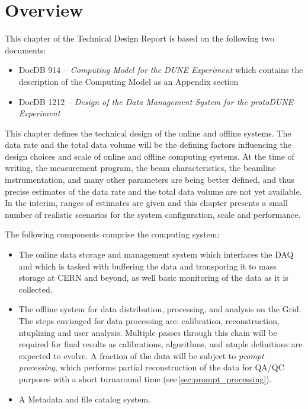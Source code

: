 \section{Overview}

This chapter of the Technical Design Report is based on the following two documents:
\begin{itemize}
\item DocDB 914 --  \textit{Computing Model for the DUNE Experiment}  which contains the
description of the \pd Computing Model as an Appendix section

\item DocDB 1212 -- \textit{Design of the Data Management System for the
protoDUNE Experiment}

\end{itemize}

\noindent This chapter defines the technical design of the online and offline systems.
The data rate and the total data volume will be the defining factors influencing the design choices and scale of \pd
online and offline computing systems.   At the time of writing, the measurement program, the beam characteristics, the beamline
instrumentation, and many other parameters are being better defined, and thus precise estimates of the data rate and the total
data volume are not yet available.  In the interim, ranges of estimates are given and this chapter presents a small number of
realistic scenarios for the system configuration, scale and performance.

The following components comprise the computing system:
\begin{itemize}

\item The online data storage and management system which interfaces the DAQ and which is tasked with buffering
the data and transporing it to mass storage at CERN and beyond, as well basic monitoring of the data as it is collected.

\item The offline system for data distribution, processing, and analysis on the Grid.  The steps envisaged for data processing are: 
calibration, reconstruction, ntuplizing and user analysis.  Multiple passes through this chain will be required for final results as
calibrations, algorithms, and ntuple definitions are expected to evolve.
A fraction of the data will be subject to \textit{prompt processing}, which performs partial reconstruction of the data for QA/QC purposes
with a short turnaround time (see\,\ref{sec:prompt_processing}).

\item  A Metadata and file catalog system.
\end{itemize}




